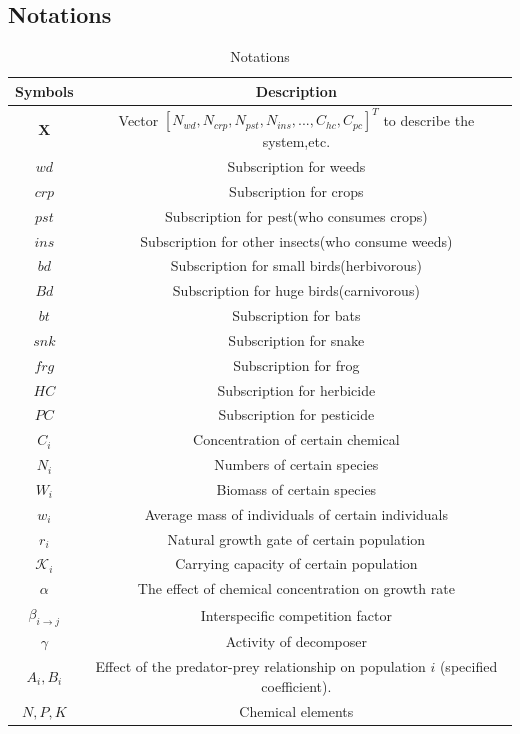 \documentclass{HZNUMCM}
\begin{document}
        \subsection{Notations}
      \begin{table}[H]
        \centering
        \caption{Notations}
        \begin{tabular}{cc}
          \toprule
          \rowcolor{customcolor!40} %
          Symbols & Description\\
          \midrule
          $\mathbf{X}$ & Vector $[N_{wd},N_{crp},N_{pst},N_{ins},...,C_{hc},C_{pc}]^T$ to describe the system,etc. \\
          $wd$ & Subscription for weeds \\
          $crp$ & Subscription for crops \\
          $pst$ & Subscription for pest(who consumes crops) \\
          $ins$ & Subscription for other insects(who consume weeds) \\
          $bd$ & Subscription for small birds(herbivorous) \\
          $Bd$ & Subscription for huge birds(carnivorous) \\
          $bt$ & Subscription for bats \\
          $snk$ & Subscription for snake \\
          $frg$ & Subscription for frog \\
          $HC$ & Subscription for herbicide \\
          $PC$ & Subscription for pesticide \\
          $C_i$ & Concentration of certain chemical \\
          $N_i$ & Numbers of certain species \\
          $W_i$ & Biomass of certain species \\
          $w_i$ & Average mass of individuals of certain individuals \\
          $r_i$ & Natural growth gate of certain population\\
          $\mathscr{K}_i$ & Carrying capacity of certain population\\
          $\alpha$ & The effect of chemical concentration on growth rate\\
          $\beta_{i \rightarrow j}$ & Interspecific competition factor\\
          $\gamma$ & Activity of decomposer\\
          $A_i,B_i$ & Effect of the predator-prey relationship on population $i$ (specified coefficient).\\
          $N,P,K$ & Chemical elements\\
          \bottomrule
        \end{tabular}
        \label{tab:Notations}
      \end{table}
\end{document}
